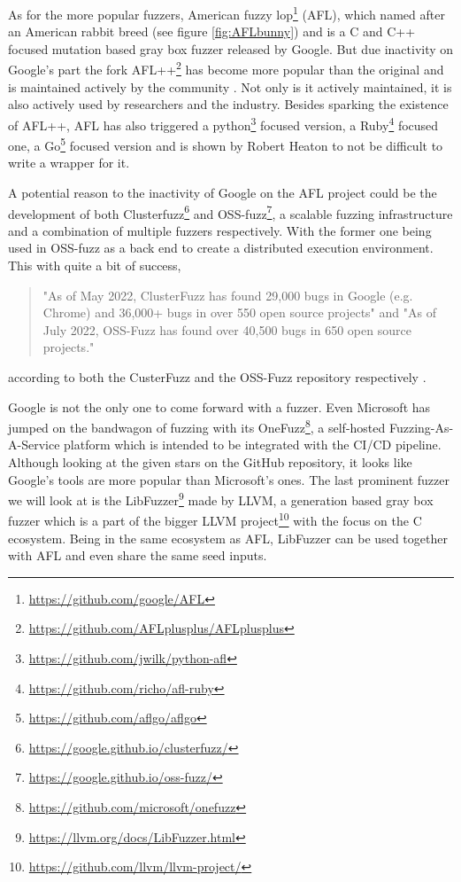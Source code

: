 As for the more popular fuzzers, American fuzzy lop\footnote{\url{https://github.com/google/AFL}} (AFL), which named after an American rabbit breed (see figure \ref{fig:AFLbunny}) and is a C and C++ focused mutation based gray box fuzzer released by Google. But due inactivity on Google's part the fork AFL++\footnote{\url{https://github.com/AFLplusplus/AFLplusplus}} has become more popular than the original and is maintained actively by the community \cite{27AFL++}. Not only is it actively maintained, it is also actively used by researchers and the industry. Besides sparking the existence of AFL++, AFL has also triggered a python\footnote{\url{https://github.com/jwilk/python-afl}} focused version, a Ruby\footnote{\url{https://github.com/richo/afl-ruby}} focused one, a Go\footnote{\url{https://github.com/aflgo/aflgo}} focused version and is shown by Robert Heaton \cite{AFLWrapper} to not be difficult to write a wrapper for it.

A potential reason to the inactivity of Google on the AFL project could be the development of both Clusterfuzz\footnote{\url{https://google.github.io/clusterfuzz/}} and OSS-fuzz\footnote{\url{https://google.github.io/oss-fuzz/}}, a scalable fuzzing infrastructure and a combination of multiple fuzzers respectively. With the former one being used in OSS-fuzz as a back end to create a distributed execution environment. This with quite a bit of success,
\begin{quote} %
	"As of May 2022, ClusterFuzz has found 29,000 bugs in Google (e.g. Chrome) and 36,000+ bugs in over 550 open source projects" and \newline
	"As of July 2022, OSS-Fuzz has found over 40,500 bugs in 650 open source projects."	
\end{quote} according to both the CusterFuzz and the OSS-Fuzz repository respectively \cite{31OSS-FuzzBugs}. 

Google is not the only one to come forward with a fuzzer. Even Microsoft has jumped on the bandwagon of fuzzing with its OneFuzz\footnote{\url{https://github.com/microsoft/onefuzz}}, a self-hosted Fuzzing-As-A-Service platform which is intended to be integrated with the CI/CD pipeline. Although looking at the given stars on the GitHub repository, it looks like Google's tools are more popular than Microsoft's ones. The last prominent fuzzer we will look at is the LibFuzzer\footnote{\url{https://llvm.org/docs/LibFuzzer.html}} made by LLVM, a generation based gray box fuzzer which is a part of the bigger LLVM project\footnote{\url{https://github.com/llvm/llvm-project/}} with the focus on the C ecosystem. Being in the same ecosystem as AFL, LibFuzzer can be used together with AFL and even share the same seed inputs.

